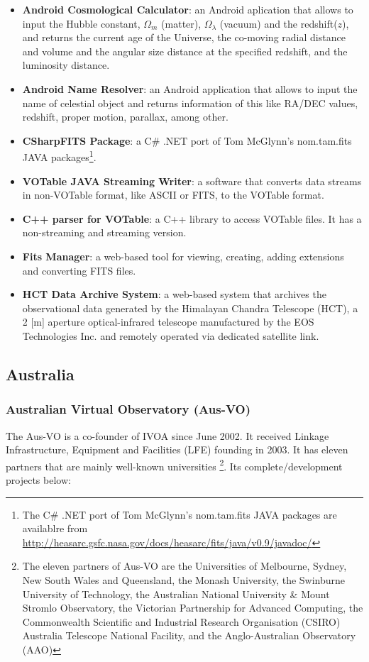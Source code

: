 \begin{itemize}
\item \textbf{Android Cosmological Calculator}:
an Android aplication that allows to input the Hubble constant, $ \Omega_{m} $
(matter), $ \Omega_{\lambda} $ (vacuum) and the redshift($ z $), and returns the
current age of the Universe, the co-moving radial distance and volume and the
angular size distance at the specified redshift, and the luminosity distance.

\item \textbf{Android Name Resolver}:
an Android application that allows to input the name of celestial object and
returns information of this like RA/DEC values, redshift, proper motion,
parallax, among other.

\item \textbf{CSharpFITS Package}:
a C\# .NET port of Tom McGlynn's nom.tam.fits JAVA packages\footnote{The C\#
.NET port of Tom McGlynn's nom.tam.fits JAVA packages are availablre from
\url{http://heasarc.gsfc.nasa.gov/docs/heasarc/fits/java/v0.9/javadoc/}}.

\item \textbf{VOTable JAVA Streaming Writer}:
a software that converts data streams in non-VOTable format, like ASCII or FITS,
to the VOTable format.

\item \textbf{C++ parser for VOTable}:
a C++ library to access VOTable files. It has a non-streaming and streaming
version.

\item \textbf{Fits Manager}:
a web-based tool for viewing, creating, adding extensions and converting FITS
files.

\item \textbf{HCT Data Archive System}:
a web-based system that archives the observational data generated by the
Himalayan Chandra Telescope (HCT), a 2 [m] aperture optical-infrared telescope
manufactured by the EOS Technologies Inc. and remotely operated via dedicated
satellite link.
\end{itemize}

\subsection{Australia}
\subsubsection{Australian Virtual Observatory (Aus-VO)}
The Aus-VO \cite{website:aus-vo-home} is a co-founder of IVOA since June 2002.
It received Linkage Infrastructure, Equipment and Facilities (LFE) founding in
2003. It has eleven partners that are mainly well-known universities
\footnote{The eleven partners of Aus-VO are the Universities of Melbourne,
Sydney, New South Wales and Queensland, the Monash University, the Swinburne
University of Technology, the Australian National University \& Mount Stromlo
Observatory, the Victorian Partnership for Advanced Computing, the Commonwealth
Scientific and Industrial Research Organisation (CSIRO) Australia Telescope
National Facility, and the Anglo-Australian Observatory (AAO)}. Its
complete/development projects below:

